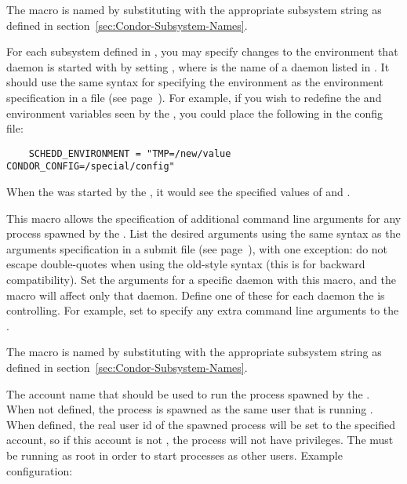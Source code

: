 \begin{description}
  The macro is named by substituting 
  with the appropriate subsystem string as defined in
  section~\ref{sec:Condor-Subsystem-Names}.

\label{param:DaemonNameEnvironment}
\item[\Macro{DAEMONNAME\_ENVIRONMENT}]
  For each subsystem defined in , you may specify
  changes to the environment that daemon is started with by setting
  , where  is the name of
  a daemon listed in . It should use the same syntax
  for specifying the environment as the environment specification in
  a  file (see page~\pageref{man-condor-submit-environment}).
  For example, if you wish to redefine the
   and  environment variables seen by the
  , you could place the following in the config file:
  \begin{verbatim}
    SCHEDD_ENVIRONMENT = "TMP=/new/value CONDOR_CONFIG=/special/config"
  \end{verbatim}
  When the  was started by the , it would
  see the specified values of  and .

\label{param:SubsysArgs}
\item[\MacroB{<SUBSYS>\_ARGS}]
  This macro allows
  the specification of additional command line arguments for any
  process spawned by the .  List the desired arguments
  using the same syntax as the arguments specification in a
   submit file (see
  page~\pageref{man-condor-submit-arguments}), with one exception: do
  not escape double-quotes when using the old-style syntax (this is
  for backward compatibility).  Set the arguments for a specific
  daemon with this macro, and the macro will affect only that
  daemon. Define one of these for each daemon the  is
  controlling.  For example, set  to specify
  any extra command line arguments to the .

  The macro is named by substituting 
  with the appropriate subsystem string as defined in
  section~\ref{sec:Condor-Subsystem-Names}.

\label{param:SubsysUserid}
\item[\MacroB{<SUBSYS>\_USERID}]
  The account name that should be used to run the  process
  spawned by the .  When not defined, the process is
  spawned as the same user that is running .  When
  defined, the real user id of the spawned process will be set to the
  specified account, so if this account is not , the process will
  not have  privileges.  The  must be running as
  root in order to start processes as other users.  Example configuration:


\end{description}
